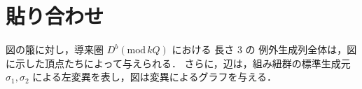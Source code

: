 \section{貼り合わせ}
\begin{prop}
	図の箙に対し，導来圏 \(D^b(\mathrm{mod}\,kQ)\) における
長さ \(3\) の 例外生成列全体は，図に示した頂点たちによって与えられる．
さらに，辺は，組み紐群の標準生成元 \(\sigma_1,\sigma_2\) による左変異を表し，図は変異によるグラフを与える．
\end{prop}

\begin{center}
\end{center}

